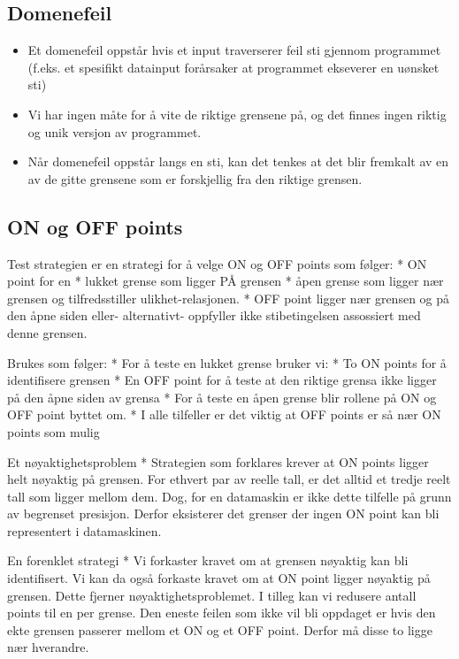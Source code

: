 \subsection{Domenefeil}

\begin{itemize}
\item
  Et domenefeil oppstår hvis et input traverserer feil sti gjennom
  programmet (f.eks. et spesifikt datainput forårsaker at programmet
  ekseverer en uønsket sti)
\item
  Vi har ingen måte for å vite de riktige grensene på, og det finnes
  ingen riktig og unik versjon av programmet.
\item
  Når domenefeil oppstår langs en sti, kan det tenkes at det blir
  fremkalt av en av de gitte grensene som er forskjellig fra den riktige
  grensen.
\end{itemize}
\subsection{ON og OFF points}

Test strategien er en strategi for å velge ON og OFF points som følger:
* ON point for en * lukket grense som ligger PÅ grensen * åpen grense
som ligger nær grensen og tilfredsstiller ulikhet-relasjonen. * OFF
point ligger nær grensen og på den åpne siden eller- alternativt-
oppfyller ikke stibetingelsen assossiert med denne grensen.

Brukes som følger: * For å teste en lukket grense bruker vi: * To ON
points for å identifisere grensen * En OFF point for å teste at den
riktige grensa ikke ligger på den åpne siden av grensa * For å teste en
åpen grense blir rollene på ON og OFF point byttet om. * I alle
tilfeller er det viktig at OFF points er så nær ON points som mulig

Et nøyaktighetsproblem * Strategien som forklares krever at ON points
ligger helt nøyaktig på grensen. For ethvert par av reelle tall, er det
alltid et tredje reelt tall som ligger mellom dem. Dog, for en
datamaskin er ikke dette tilfelle på grunn av begrenset presisjon.
Derfor eksisterer det grenser der ingen ON point kan bli representert i
datamaskinen.

En forenklet strategi * Vi forkaster kravet om at grensen nøyaktig kan
bli identifisert. Vi kan da også forkaste kravet om at ON point ligger
nøyaktig på grensen. Dette fjerner nøyaktighetsproblemet. I tilleg kan
vi redusere antall points til en per grense. Den eneste feilen som ikke
vil bli oppdaget er hvis den ekte grensen passerer mellom et ON og et
OFF point. Derfor må disse to ligge nær hverandre.

